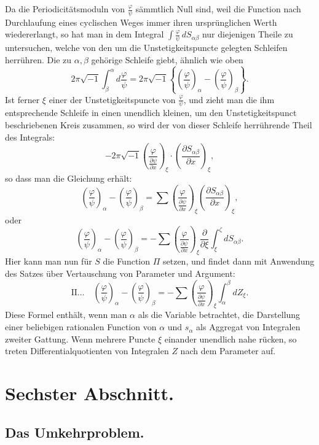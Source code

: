 \documentclass[10pt]{article}
\begin{document}
Da die Periodicitätsmoduln von \(\frac{\varphi}{\psi}\) sämmtlich Null sind, weil die Function nach Durchlaufung eines cyclischen Weges immer ihren ursprünglichen Werth wiedererlangt, so hat man in dem Integral \(\int \frac{\varphi}{\psi}\,dS_{\alpha\beta}\) nur diejenigen Theile zu untersuchen, welche von den um die Unstetigkeitspuncte gelegten Schleifen herrühren. Die zu \(\alpha,\beta\) gehörige Schleife giebt, ähnlich wie oben
\[
2\pi\sqrt{-1}\int_{\beta}^{\alpha} d\frac{\varphi}{\psi}
=2\pi\sqrt{-1}\left\{\left(\frac{\varphi}{\psi}\right)_{\alpha}-\left(\frac{\varphi}{\psi}\right)_{\beta}\right\}.
\]
Ist ferner \(\xi\) einer der Unstetigkeitspuncte von \(\frac{\varphi}{\psi}\), und zieht man die ihm entsprechende Schleife in einen unendlich kleinen, um den Unstetigkeitspunct beschriebenen Kreis zusammen, so wird der von dieser Schleife herrührende Theil des Integrals:
\[
-2\pi\sqrt{-1}\left(\frac{\varphi}{\frac{\partial\psi}{\partial x}}\right)_{\xi}\cdot
\left(\frac{\partial S_{\alpha\beta}}{\partial x}\right)_{\xi},
\]
so dass man die Gleichung erhält:
\[
\left(\frac{\varphi}{\psi}\right)_{\alpha}-\left(\frac{\varphi}{\psi}\right)_{\beta}
=\sum\left(\frac{\varphi}{\frac{\partial\psi}{\partial x}}\right)_{\xi}
\left(\frac{\partial S_{\alpha\beta}}{\partial x}\right)_{\xi},
\]
oder
\[
\left(\frac{\varphi}{\psi}\right)_{\alpha}-\left(\frac{\varphi}{\psi}\right)_{\beta}
=-\sum\left(\frac{\varphi}{\frac{\partial\psi}{\partial x}}\right)_{\xi}
\frac{\partial}{\partial\xi}\int_{\xi}^{\zeta}dS_{\alpha\beta}.
\]
Hier kann man nun für \(S\) die Function \(\Pi\) setzen, und findet dann mit Anwendung des Satzes über Vertauschung von Parameter und Argument:
\[
\mathrm{II}\ldots\quad
\left(\frac{\varphi}{\psi}\right)_{\alpha}-\left(\frac{\varphi}{\psi}\right)_{\beta}
=-\sum\left(\frac{\varphi}{\frac{\partial\psi}{\partial x}}\right)_{\xi}
\int_{\alpha}^{\beta}dZ_{\xi}.
\]
Diese Formel enthält, wenn man \(\alpha\) als die Variable betrachtet, die Darstellung einer beliebigen rationalen Function von \(\alpha\) und \(s_{\alpha}\) als Aggregat von Integralen zweiter Gattung. Wenn mehrere Puncte \(\xi\) einander unendlich nahe rücken, so treten Differentialquotienten von Integralen \(Z\) nach dem Parameter auf.

\section*{Sechster Abschnitt.}
\subsection*{Das Umkehrproblem.}
\end{document}

